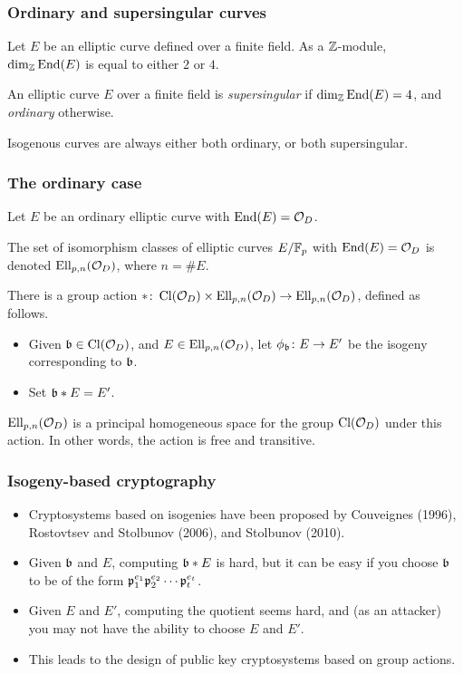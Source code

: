 \documentclass{beamer}
\begin{document}
\begin{frame}
\frametitle{Ordinary and supersingular curves}

\begin{theorem}
Let $E$ be an elliptic curve defined over a finite field.
As a $\mathbb{Z}$-module, $\dim_{\mathbb{Z}} \operatorname{End}(E)$ is equal to either $2$ or $4$.
\end{theorem}

\begin{definition}
An elliptic curve $E$ over a finite field is \emph{supersingular} if
$\dim_{\mathbb{Z}} \operatorname{End}(E) = 4$, and \emph{ordinary} otherwise.
\end{definition}

 Isogenous curves are always either both ordinary, or both supersingular.
\end{frame}

\begin{frame}
\frametitle{The ordinary case}

Let $E$ be an ordinary elliptic curve with
$\operatorname{End}(E) = \mathcal{O}_D$.

\begin{definition}
The set of isomorphism classes of elliptic curves $E/\mathbb{F}_p$ with
$\operatorname{End}(E) = \mathcal{O}_D$ is denoted ${\operatorname{Ell}}_{p,n}(\mathcal{O}_D)$, where $n = \#E$.
\end{definition}

\begin{theorem}[Waterhouse 1969]
There is a group action $*\colon \operatorname{Cl}(\mathcal{O}_D) \times {\operatorname{Ell}}_{p,n}(\mathcal{O}_D) \to
{\operatorname{Ell}}_{p,n}(\mathcal{O}_D)$, defined as follows.
\begin{itemize}
\item Given ${\mathfrak{b}} \in \operatorname{Cl}(\mathcal{O}_D)$, and $E \in {\operatorname{Ell}}_{p,n}(\mathcal{O}_D)$, let
  $\phi_{\mathfrak{b}}\colon E \to E'$ be the isogeny corresponding to ${\mathfrak{b}}$.
\item Set ${\mathfrak{b}} * E = E'$. 
\end{itemize}
${\operatorname{Ell}}_{p,n}(\mathcal{O}_D)$ is a principal homogeneous space for the group
$\operatorname{Cl}(\mathcal{O}_D)$ under this action. In other words, the action is free and
transitive.
\end{theorem}
\end{frame}

\begin{frame}
\frametitle{Isogeny-based cryptography}
\begin{itemize}
\item Cryptosystems based on isogenies have been proposed by
  Couveignes (1996), Rostovtsev and Stolbunov (2006), and Stolbunov
  (2010).

\item Given ${\mathfrak{b}}$ and $E$, computing ${\mathfrak{b}} * E$ is hard, but it can be
  easy if you choose ${\mathfrak{b}}$ to be of the form $\mathfrak{p}_1^{e_1} \mathfrak{p}_2^{e_2}
  \cdots \mathfrak{p}_t^{e_t}$.

\item Given $E$ and $E'$, computing the quotient seems hard, and (as an
  attacker) you may not have the ability to choose $E$ and $E'$.

\item This leads to the design of public key cryptosystems based on
  group actions.
\end{itemize}
\end{frame}
\end{document}
